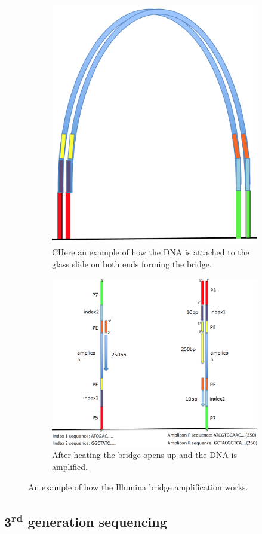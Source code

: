 \begin{figure}[h]
    \centering
    \begin{subfigure}{0.35\textwidth}
        \includegraphics[width=\linewidth]{Figures/Bridge1.png}
        \caption{CHere an example of how the DNA is attached to the glass slide on both ends forming the bridge.}
    \end{subfigure}
    \hfill
    \begin{subfigure}{0.55\textwidth}
        \includegraphics[width=\linewidth]{Figures/Bridge2.png}
        \caption{After heating the bridge opens up and the DNA is amplified.}
    \end{subfigure}
    \caption{An example of how the Illumina bridge amplification works.}
    \label{fig:BridgeAmpl}
\end{figure}

\subsection{3\textsuperscript{rd} generation sequencing}

